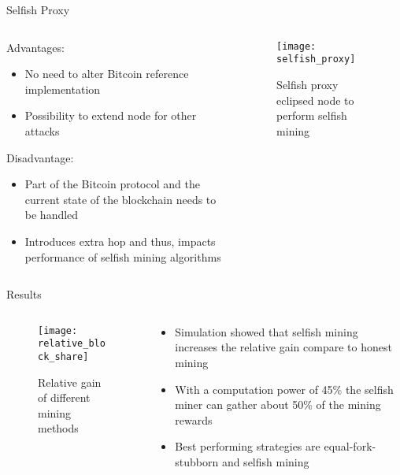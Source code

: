 \documentclass[final,hyperref={pdfpagelabels=true}]{beamer}
\begin{document}
\begin{frame}
\begin{block}{Selfish Proxy}
\begin{columns}[t]
\begin{column}{.45\textwidth}
     		\bigskip
     		Advantages:
     		\begin{itemize}
     			\item No need to alter Bitcoin reference implementation
     			\item Possibility to extend node for other attacks
			\end{itemize}
     		Disadvantage:
     		\begin{itemize}
     			\item Part of the Bitcoin protocol and the current state of the blockchain needs to be handled
     			\item Introduces extra hop and thus, impacts performance of selfish mining algorithms
			\end{itemize}   			
    	\end{column}
 	
        \begin{column}{.45\textwidth}
        	\begin{figure}[t]
        	    \vspace*{-1cm}
            	\texttt{[image: selfish\_proxy]}
            	\centering
            	\caption{Selfish proxy eclipsed node to perform selfish mining}
        	\end{figure} 
    	\end{column}
    	
  	\end{columns}
  \end{block}

  \begin{columns}[t]

    \begin{column}{.55\textwidth}
      \begin{block}{Results}
		
		\begin{columns}[t]

    		\begin{column}{.45\textwidth}
        		\begin{figure}[t]
        			\vspace*{-1cm}
            		\texttt{[image: relative\_block\_share]}
            		\centering
            		\caption{Relative gain of different mining methods}
        		\end{figure}
    		\end{column}
    		\begin{column}{.45\textwidth}
				\begin{itemize}
					\item Simulation showed that selfish mining increases the relative gain compare to honest mining
					\item With a computation power of 45\% the selfish miner can gather about 50\% of the mining rewards
					\item Best performing strategies are equal-fork-stubborn and selfish mining
				\end{itemize}
    		\end{column}
  		\end{columns}
  		

\end{block}
\end{column}
\end{columns}
\end{frame}
\end{document}
